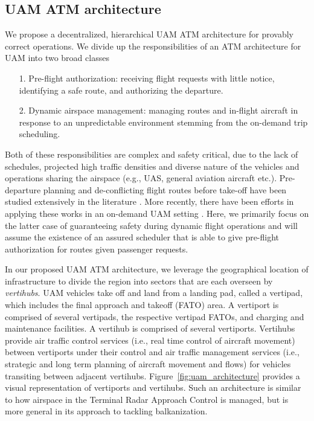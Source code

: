 \subsection{UAM ATM architecture}
We propose a decentralized, hierarchical UAM ATM architecture for provably correct operations. We divide up the responsibilities of an ATM architecture for UAM into two broad classes
\begin{itemize}
    \item[1.] Pre-flight authorization: receiving flight requests with little notice, identifying a safe route, and authorizing the departure.
\item[2.] Dynamic airspace management: managing routes and in-flight aircraft in response to an unpredictable environment stemming from the on-demand trip scheduling.
\end{itemize}

Both of these responsibilities are complex and safety critical, due to the lack of schedules, projected high traffic densities and diverse nature of the vehicles and operations sharing the airspace (e.g., UAS, general aviation aircraft etc.). Pre-departure planning and de-conflicting flight routes before take-off have been studied extensively in the literature \cite{6011668,7415976,7934784}. More recently, there have been efforts in applying these works in an on-demand UAM setting \cite{guerreiro2019mission}. Here, we primarily focus on the latter case of guaranteeing safety during dynamic flight operations and will assume the existence of an assured scheduler that is able to give pre-flight authorization for routes given passenger requests. 

In our proposed UAM ATM architecture, we leverage the geographical location of infrastructure to divide the region into sectors that are each overseen by \emph{vertihubs}. UAM vehicles take off and land from a landing pad, called a vertipad, which includes the final approach and takeoff (FATO) area. A vertiport is comprised of several vertipads, the respective vertipad FATOs, and charging and maintenance facilities.  A vertihub is comprised of several vertiports.  Vertihubs provide air traffic control services (i.e., real time control of aircraft movement) between vertiports under their control and air traffic management services (i.e., strategic and long term planning of aircraft movement and flows) for vehicles transiting between adjacent vertihubs.  Figure~\ref{fig:uam_architecture} provides a visual representation of vertiports and vertihubs.  Such an architecture is similar to how airspace in the Terminal Radar Approach Control is managed, but is more general in its approach to tackling balkanization. 


